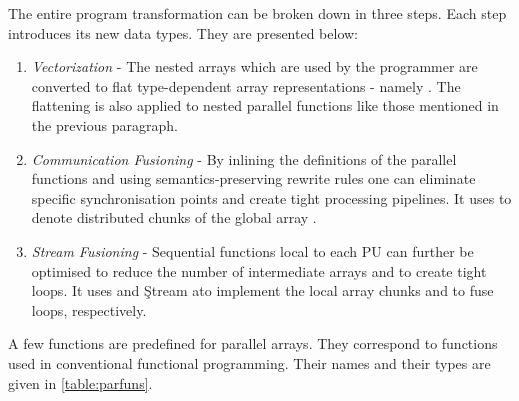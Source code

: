     The entire program transformation can be broken down in three steps.
    Each step introduces its new data types. They are presented below:
    \begin{enumerate}
      \item \emph{Vectorization} -
        The nested arrays \pan{} which are used by the programmer
        are converted to flat type-dependent array representations - namely  \pav{}.
        The flattening is also applied to nested parallel functions like
        those mentioned in the previous paragraph.
      \item \emph{Communication Fusioning} -
        By inlining the definitions of the parallel functions and
        using semantics-preserving rewrite rules one can
        eliminate specific synchronisation points and
        create tight processing pipelines. It uses \pad{} to denote
        distributed chunks of the global array \pav{}.
      \item \emph{Stream Fusioning} -
        Sequential functions local to each PU can further
        be optimised to reduce the number of intermediate arrays
        and to create tight loops.
        It uses  and \c{Stream a}\footnotemark to
        implement the local array chunks and to fuse loops, respectively.
    \end{enumerate}
    
    
    
    
  \p
  A few functions are predefined for parallel arrays.
  They correspond to functions used in conventional functional programming.
  Their names and their types are given in \ref{table:parfuns}.
  
